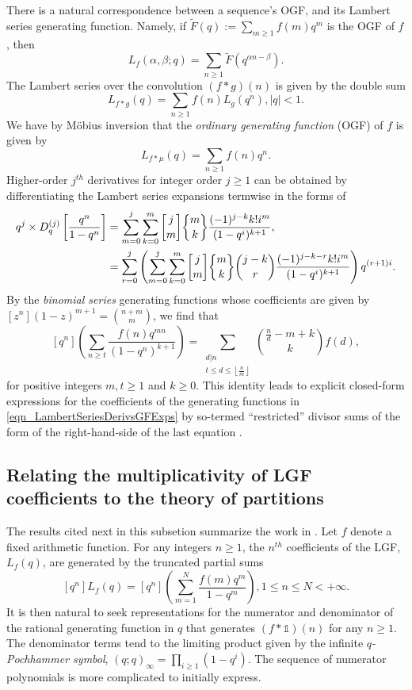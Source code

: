\documentclass[12pt,reqno,a4letter]{article}
\numberwithin{figure}{section}
\numberwithin{table}{section}
\numberwithin{equation}{section}
\newcommand{\gkpSI}[2]{\ensuremath{\genfrac{\lbrack}{\rbrack}{0pt}{}{#1}{#2}}}
\newcommand{\gkpSII}[2]{\ensuremath{\genfrac{\lbrace}{\rbrace}{0pt}{}{#1}{#2}}}
\newcommand{\Floor}[2]{\ensuremath{\left\lfloor \frac{#1}{#2} \right\rfloor}}
\theoremstyle{plain}
\numberwithin{theorem}{section}
\theoremstyle{definition}
\begin{document}
There is a natural correspondence between a sequence's OGF, and its 
Lambert series generating function. Namely, if $\widetilde{F}(q) := \sum_{m \geq 1} f(m) q^m$ is the OGF of 
$f$, then $$L_f(\alpha, \beta; q) = \sum_{n \geq 1} \widetilde{F}(q^{\alpha n-\beta}).$$ 
The Lambert series over the convolution $(f \ast g)(n)$ is given by the double sum 
\[
L_{f \ast g}(q) = \sum_{n \geq 1} f(n) L_g(q^n), |q| < 1. 
\]
We have by M\"obius inversion that the \emph{ordinary generating function} (OGF) of $f$ is 
given by 
\[
L_{f \ast \mu}(q) = \sum_{n \geq 1} f(n) q^n. 
\]
Higher-order $j^{th}$ derivatives for integer order $j \geq 1$ can be obtained by differentiating 
the Lambert series expansions termwise in the forms of 
\begin{subequations}
\label{eqn_LambertSeriesDerivsGFExps} 
\begin{align}
q^j \times D_q^{(j)}\left[\frac{q^n}{1-q^n}\right] & = 
     \sum_{m=0}^j \sum_{k=0}^m \gkpSI{j}{m} 
     \gkpSII{m}{k} \frac{(-1)^{j-k} k! i^m}{(1-q^i)^{k+1}}, \\ 
     & = \sum_{r=0}^j \left(\sum_{m=0}^j \sum_{k=0}^m \gkpSI{j}{m}
     \gkpSII{m}{k} \binom{j-k}{r} \frac{(-1)^{j-k-r} k! i^m}{(1-q^i)^{k+1}}\right) q^{(r+1)i}. 
\end{align}
\end{subequations}
By the \emph{binomial series} generating functions whose coefficients are 
given by $[z^n] (1-z)^{m+1} = \binom{n+m}{m}$, we find that 
\[
[q^n] \left(\sum_{n \geq t} \frac{f(n) q^{mn}}{(1-q^n)^{k+1}}\right) = 
     \sum_{\substack{d|n \\ t \leq d \leq \Floor{n}{m}}} 
     \binom{\frac{n}{d} - m + k}{k} f(d), 
\]
for positive integers $m,t \geq 1$ and $k \geq 0$. 
This identity leads to explicit closed-form expressions for the coefficients of the 
generating functions in \eqref{eqn_LambertSeriesDerivsGFExps} 
by so-termed ``restricted'' divisor sums of the form of the right-hand-side of the last equation 
\cite{MDS-COMBRESTRDIVSUMS-INTEGERS}. 

\subsection{Relating the multiplicativity of LGF coefficients to the theory of partitions} 

The results cited next in this subsetion summarize the work in 
\cite{AA,MERCA-SCHMIDT-LSFACTTHM}. 
Let $f$ denote a fixed arithmetic function. 
For any integers $n \geq 1$, the $n^{th}$ coefficients of the LGF, $L_f(q)$, are 
generated by the truncated partial sums 
\[
[q^n] L_f(q) = [q^n]\left(\sum_{m=1}^{N} \frac{f(m) q^m}{1-q^m}\right), 1 \leq n \leq N < +\infty. 
\]
It is then natural to seek representations for the numerator and denominator of the 
rational generating function in $q$ that generates $(f \ast \mathds{1})(n)$ for any $n \geq 1$. 
The denominator terms tend to the limiting product given by the 
infinite \emph{$q$-Pochhammer symbol}, $(q; q)_{\infty} = \prod_{i \geq 1} (1-q^i)$. 
The sequence of numerator polynomials is more complicated to initially express. 
\end{document}
